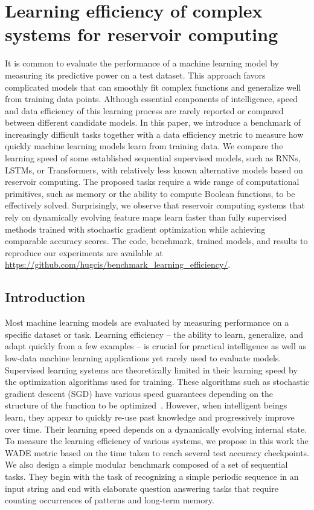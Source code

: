 \chapter{Learning efficiency of complex systems for reservoir computing}

  It is common to evaluate the performance of a machine learning model by
  measuring its predictive power on a test dataset. This approach favors
  complicated models that can smoothly fit complex functions and generalize well
  from training data points. Although essential components of intelligence,
  speed and data efficiency of this learning process are rarely reported or
  compared between different candidate models. In this paper, we introduce a
  benchmark of increasingly difficult tasks together with a data efficiency
  metric to measure how quickly machine learning models learn from training
  data. We compare the learning speed of some established sequential supervised
  models, such as RNNs, LSTMs, or Transformers, with relatively less known
  alternative models based on reservoir computing. The proposed tasks require a
  wide range of computational primitives, such as memory or the ability to
  compute Boolean functions, to be effectively solved. Surprisingly, we observe
  that reservoir computing systems that rely on dynamically evolving feature
  maps learn faster than fully supervised methods trained with stochastic
  gradient optimization while achieving comparable accuracy scores. The code,
  benchmark, trained models, and results to reproduce our experiments are
  available at {\small\url{https://github.com/hugcis/benchmark_learning_efficiency/}}.


\section{Introduction}
Most machine learning models are evaluated by measuring performance on a
specific dataset or task. Learning efficiency -- the ability to learn,
generalize, and adapt quickly from a few examples -- is crucial for practical
intelligence \cite{kanazawaGeneralIntelligenceDomainspecific2004} as well as
low-data machine learning applications yet rarely used to evaluate models.
Supervised learning systems are theoretically limited in their learning speed by
the optimization algorithms used for training. These algorithms such as
stochastic gradient descent (SGD) have various speed guarantees depending on the
structure of the function to be
optimized~\cite{bottouOptimizationMethodsLargescale2018}. However, when
intelligent beings learn, they appear to quickly re-use past knowledge and
progressively improve over time. Their learning speed depends on a dynamically
evolving internal state.
To measure the learning efficiency of various systems, we propose in this work the \ac{WADE}
metric based on the time taken to reach several test accuracy checkpoints. We
also design a simple modular benchmark composed of a set of sequential tasks.
They begin with the task of recognizing a simple periodic sequence in an input
string and end with elaborate question answering tasks that require counting
occurrences of patterns and long-term memory.

